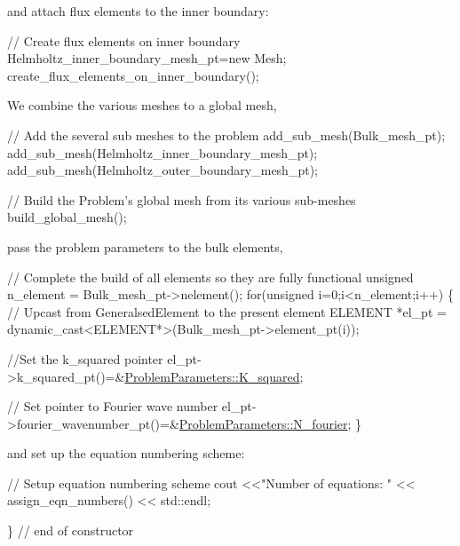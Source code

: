 and attach flux elements to the inner boundary\+:


\begin{DoxyCodeInclude}

 \textcolor{comment}{// Create flux elements on inner boundary}
 Helmholtz\_inner\_boundary\_mesh\_pt=\textcolor{keyword}{new} Mesh;
 create\_flux\_elements\_on\_inner\_boundary();

\end{DoxyCodeInclude}


We combine the various meshes to a global mesh,


\begin{DoxyCodeInclude}
 
 \textcolor{comment}{// Add the several  sub meshes to the problem}
 add\_sub\_mesh(Bulk\_mesh\_pt); 
 add\_sub\_mesh(Helmholtz\_inner\_boundary\_mesh\_pt); 
 add\_sub\_mesh(Helmholtz\_outer\_boundary\_mesh\_pt); 
  
 \textcolor{comment}{// Build the Problem's global mesh from its various sub-meshes}
 build\_global\_mesh();

\end{DoxyCodeInclude}


pass the problem parameters to the bulk elements,


\begin{DoxyCodeInclude}

 \textcolor{comment}{// Complete the build of all elements so they are fully functional}
 \textcolor{keywordtype}{unsigned} n\_element = Bulk\_mesh\_pt->nelement();
 \textcolor{keywordflow}{for}(\textcolor{keywordtype}{unsigned} i=0;i<n\_element;i++)
  \{
   \textcolor{comment}{// Upcast from GeneralsedElement to the present element}
   ELEMENT *el\_pt = \textcolor{keyword}{dynamic\_cast<}ELEMENT*\textcolor{keyword}{>}(Bulk\_mesh\_pt->element\_pt(i));
   
   \textcolor{comment}{//Set the k\_squared pointer}
   el\_pt->k\_squared\_pt()=&\hyperlink{namespaceProblemParameters_aa5362de1af9e257fde4317c367158a93}{ProblemParameters::K\_squared};
   
   \textcolor{comment}{// Set pointer to Fourier wave number}
   el\_pt->fourier\_wavenumber\_pt()=&\hyperlink{namespaceProblemParameters_aaa674958a1ca6ee0b99de3377288c93f}{ProblemParameters::N\_fourier};
  \}

\end{DoxyCodeInclude}


and set up the equation numbering scheme\+:


\begin{DoxyCodeInclude}
 
 \textcolor{comment}{// Setup equation numbering scheme}
 cout <<\textcolor{stringliteral}{"Number of equations: "} << assign\_eqn\_numbers() << std::endl; 

\} \textcolor{comment}{// end of constructor}

\end{DoxyCodeInclude}


